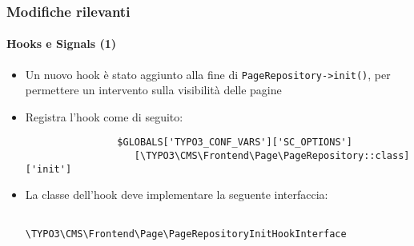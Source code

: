 
\begin{frame}[fragile]
	\frametitle{Modifiche rilevanti}
	\framesubtitle{Hooks e Signals (1)}

	\begin{itemize}

		\item Un nuovo hook è stato aggiunto alla fine di \texttt{PageRepository->init()},
			per permettere un intervento sulla visibilità delle pagine

		\item Registra l'hook come di seguito:
			\begin{lstlisting}
				$GLOBALS['TYPO3_CONF_VARS']['SC_OPTIONS']
				   [\TYPO3\CMS\Frontend\Page\PageRepository::class]['init']
			\end{lstlisting}

		\item La classe dell'hook deve implementare la seguente interfaccia:
			\begin{lstlisting}
				\TYPO3\CMS\Frontend\Page\PageRepositoryInitHookInterface
			\end{lstlisting}

	\end{itemize}

\end{frame}


